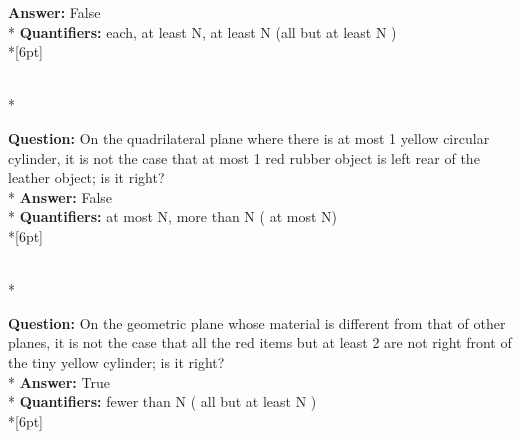\begin{figure*}
\begin{minipage}{0.48\textwidth}
\begin{minipage}[t][2.2cm][t]{1\textwidth}
      \textbf{Answer:} False \\*
      \textbf{Quantifiers:} each, at least N, at least N (all but at least N ) \\*[6pt]
    \end{minipage}\\*
    \begin{minipage}[t][2.2cm][t]{1\textwidth}
      \footnotesize
      \textbf{Question:}  On the quadrilateral plane where there is at most 1 yellow circular cylinder, it is not the case that at most 1 red rubber object is left rear of the leather object; is it right? \\*
      \textbf{Answer:}  False \\*
      \textbf{Quantifiers:}  at most N, more than N ( at most N) \\*[6pt]
    \end{minipage}\\*
    \begin{minipage}[t][2.2cm][t]{1\textwidth}
      \footnotesize
      \textbf{Question:} On the geometric plane whose material is different from that of other planes, it is not the case that all the red items but at least 2 are not right front of the tiny yellow cylinder; is it right? \\*
      \textbf{Answer:} True \\*
      \textbf{Quantifiers:} fewer than N ( all but at least N ) \\*[6pt]
    \end{minipage}
  \end{minipage}
  \vspace{0.2cm}
  

\end{figure*}
